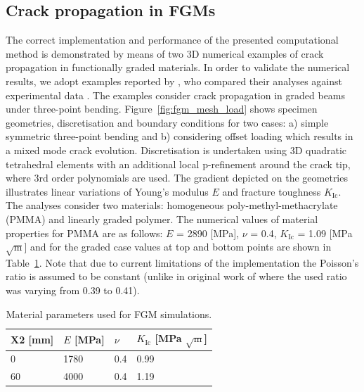 \documentclass[onecolumn]{svjour3}
\begin{document}
\subsection{Crack propagation in FGMs}
The correct implementation and performance of the presented computational method is demonstrated by means of two 3D numerical examples of crack propagation in functionally graded materials. In order to validate the numerical results, we adopt examples reported by \cite{kim2004simulation}, who compared their analyses against experimental data \cite{galvez1996crack, rousseau2000compositionally}. The examples consider crack propagation in graded beams under three-point bending. Figure~\ref{fig:fgm_mesh_load} shows specimen geometries, discretisation and boundary conditions for two cases: a) simple symmetric three-point bending and b) considering offset loading which results in a mixed mode crack evolution. Discretisation is undertaken using 3D quadratic tetrahedral elements with an additional local p-refinement around the crack tip, where 3rd order polynomials are used. 
% 
The gradient depicted on the geometries illustrates linear variations of Young's modulus $E$ and fracture toughness $K_\mathrm{Ic}$. The analyses consider two materials: homogeneous poly-methyl-methacrylate (PMMA) and linearly graded polymer. The numerical values of material properties for PMMA are as follows: $E$ = 2890 [MPa], $\nu$ = 0.4,  $K_\mathrm{Ic}$ = 1.09 [MPa $\sqrt{\mathrm m}$] and for the graded case values at top and bottom points are shown in Table~\ref{tab:parameters_fgm}. Note that due to current limitations of the implementation the Poisson's ratio is assumed to be constant (unlike in original work of \cite{kim2004simulation} where the used ratio was varying from 0.39 to 0.41). 
% 
\begin{table}[h]
	\centering
	\begin{tabular}{llll}
		\hline
		X2 [mm]            \hspace{1.0cm} 	&  $E$ [MPa] \hspace{1.0cm} & $\nu$    \hspace{1.0cm}     & $K_\mathrm{Ic}$ [MPa $\sqrt{\mathrm m}$]  \\ \hline
		$0  $              \hspace{1.0cm}   &  1780  	 \hspace{1.0cm}	& 0.4      \hspace{1.0cm}  		&  0.99\\
		$60  $            \hspace{1.0cm}   &  4000  	 \hspace{1.0cm}	& 0.4      \hspace{1.0cm}     &  1.19 \\
		\hline
	\end{tabular} 
	\caption{Material parameters used for FGM simulations.}
	\label{tab:parameters_fgm}
\end{table}
\end{document}
